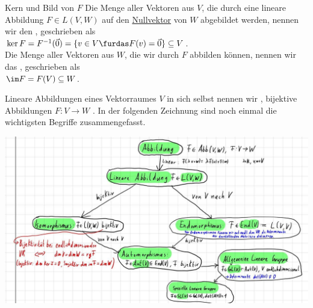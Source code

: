 \begin{Wiederholung}
{Kern und Bild von $F$}
Die Menge aller Vektoren aus $V$, die durch eine lineare Abbildung $F\in L(V,W)$ auf den \underline{Nullvektor} von $W$ abgebildet werden, nennen wir den , geschrieben als\\
$\ker F= F^{-1}(\Vec{0})=\{v\in V\furdas F(v)=\Vec{0}\}\subseteq V$.\\
Die Menge aller Vektoren aus $W$, die wir durch $F$ abbilden können, nennen wir das , geschrieben als\\
$\im F=F(V)\subseteq W$.
\end{Wiederholung}
Lineare Abbildungen eines Vektorraumes $V$ in sich selbst nennen wir , bijektive Abbildungen $F:V\to W$ . In der folgenden Zeichnung sind noch einmal die wichtigsten Begriffe zusammengefasst.
\begin{center}
    \includegraphics[width=.7\textwidth]{Dateien/01/01Wiederholung.jpg}
\end{center}

